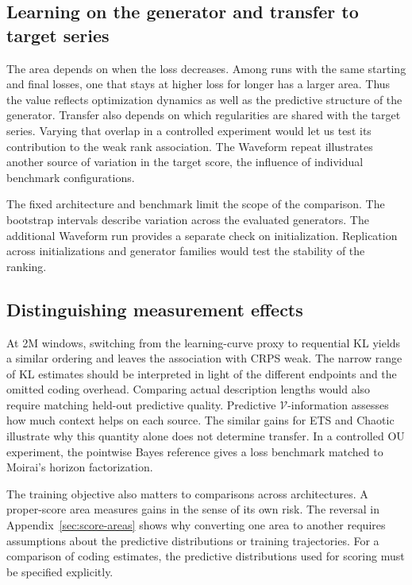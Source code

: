 \documentclass[10pt,a4paper]{article}
\theoremstyle{definition}
\begin{document}
\subsection{Learning on the generator and transfer to target series}
The area depends on when the loss decreases. Among runs with the same
starting and final losses, one that stays at higher loss for longer has
a larger area. Thus the value reflects optimization dynamics as well
as the predictive structure of the generator. Transfer also depends on
which regularities are shared with the target series. Varying that overlap
in a controlled experiment would let us test its contribution to the
weak rank association. The Waveform repeat illustrates another source
of variation in the target score, the influence of individual
benchmark configurations.

The fixed architecture and benchmark limit the scope of the comparison.
The bootstrap intervals describe variation across the evaluated generators.
The additional Waveform run provides a separate check on initialization.
Replication across initializations and generator families would test the
stability of the ranking.

\subsection{Distinguishing measurement effects}
At 2M windows, switching from the learning-curve proxy to requential KL
yields a similar ordering and leaves the association with CRPS weak.
The narrow range of KL estimates should be interpreted in light of the
different endpoints and the omitted coding overhead. Comparing actual
description lengths would also require matching held-out predictive
quality. Predictive $\mathcal V$-information assesses how much context
helps on each source. The similar gains for ETS and Chaotic illustrate
why this quantity alone does not determine transfer. In a controlled OU
experiment, the pointwise Bayes reference gives a loss benchmark matched
to Moirai's horizon factorization.

The training objective also matters to comparisons across architectures.
A proper-score area measures gains in the sense of its own risk.
The reversal in Appendix~\ref{sec:score-areas} shows why converting one
area to another requires assumptions about the predictive distributions
or training trajectories. For a comparison of coding estimates, the
predictive distributions used for scoring must be specified explicitly.
\end{document}
